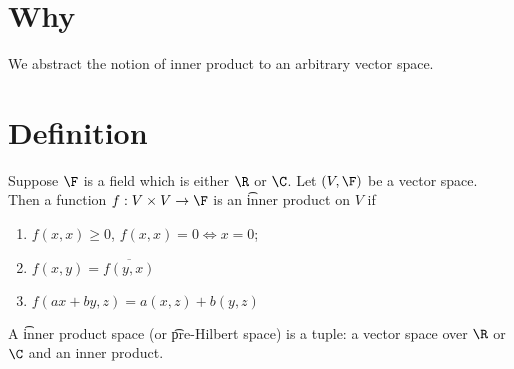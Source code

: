 

\section*{Why}

We abstract the notion of inner product to an arbitrary vector space.

\section*{Definition}

Suppose $\F $ is a field which is either $\R $ or $\C $. Let $(V, \F )$ be a vector space.
Then a function $f: V \times  V \to \F $ is an \t{inner product} on $V$ if
    \begin{enumerate}
      \item $f(x, x) \geq 0$, $f(x, x) = 0 \Leftrightarrow x = 0$;
      \item $f(x, y) = \overline{f(y, x)}$
      \item $f(ax + by, z) = a(x, z) + b(y, z)$
    \end{enumerate}
A \t{inner product space} (or \t{pre-Hilbert space}) is a tuple: a vector space over $\R $ or $\C $ and an inner product.

\blankpage